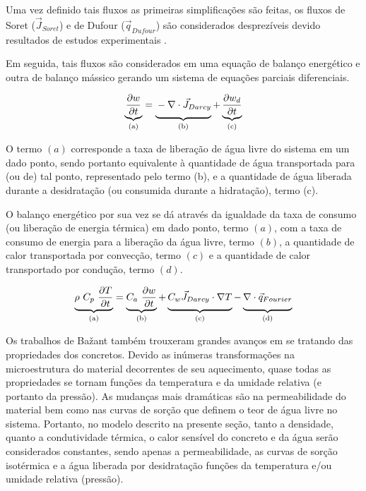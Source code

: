     Uma vez definido tais fluxos as primeiras simplificações são feitas, os
    fluxos de Soret ($\vec{J}_{Soret}$) e de Dufour ($\vec{q}_{Dufour}$) são considerados
    desprezíveis devido resultados de estudos experimentais \cite{bazant1979}.

    Em seguida, tais fluxos são considerados em uma equação de balanço
    energético e outra de balanço mássico gerando um sistema de equações
    parciais diferenciais.

    \begin{equation}
      \label{eq:baz_MB}
      \underbrace{\frac{\partial w}{\partial t}}_{\text{(a)}} = \underbrace{\vphantom{ \left(\frac{a}{b}\right) } - \nabla \cdot \vec{J}_{Darcy}}_{\text{(b)}} + \underbrace{\frac{\partial w_d}{\partial t}}_{\text{(c)}}
    \end{equation}

    O termo $(a)$ corresponde a taxa de liberação de água livre do sistema em um
    dado ponto, sendo portanto equivalente à quantidade de água transportada
    para (ou de) tal ponto, representado pelo termo (b), e a quantidade de água liberada durante a
    desidratação (ou consumida durante a hidratação), termo (c).

    O balanço energético por sua vez se dá através da igualdade da taxa de
    consumo (ou liberação de energia térmica) em dado ponto, termo $(a)$, com a taxa de
    consumo de energia para a liberação da água livre, termo $(b)$, a quantidade
    de calor transportada por convecção, termo $(c)$ e a quantidade de calor
    transportado por condução, termo $(d)$.

    \begin{equation}
      \label{eq:baz_EB}
      \underbrace{\rho \ C_p \ \frac{\partial T}{\partial t}}_{\text{(a)}} = \underbrace{C_a \ \frac{\partial w}{\partial t}}_{\text{(b)}} + \underbrace{\vphantom{\left(\frac{a}{b}\right)} C_w \vec{J}_{Darcy}\cdot \nabla T}_{\text{(c)}} - \underbrace{\vphantom{\left(\frac{a}{b}\right)} \nabla \cdot \vec{q}_{Fourier}}_{\text{(d)}}
    \end{equation}
    
    Os trabalhos de Ba\v{z}ant também trouxeram grandes avanços em se tratando
    das propriedades dos concretos. Devido as inúmeras transformações na
    microestrutura do material decorrentes de seu aquecimento, quase todas as
    propriedades se tornam funções da temperatura e da umidade relativa (e
    portanto da pressão). As mudanças mais dramáticas são na permeabilidade do
    material bem como nas curvas de sorção que definem o teor de água livre no
    sistema. Portanto, no modelo descrito na presente seção, tanto a densidade,
    quanto a condutividade térmica, o calor sensível do concreto e da água serão
    considerados constantes, sendo apenas a permeabilidade, as curvas de sorção
    isotérmica e a água liberada por desidratação funções da temperatura e/ou
    umidade relativa (pressão).


